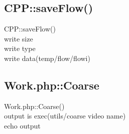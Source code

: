 \documentclass{article}
\begin{document}
\subsection{CPP::saveFlow()}
CPP::saveFlow()\\
\indent write size\\
\indent write type\\
\indent write data(temp/flow/flowi)

\subsection{Work.php::Coarse}
Work.php::Coarse()\\
\indent output is exec(utils/coarse video name)\\
\indent echo output


\iffalse
\fi
\end{document}
